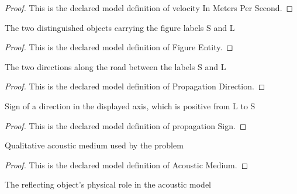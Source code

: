 \begin{proof}
  This is the declared model definition of velocity In Meters Per Second.
\end{proof}
\begin{definition}
  \label{def:physics:phyx-mini-0197:phyxminiproblems-problemphyxmini0197-figureentity}
  The two distinguished objects carrying the figure labels S and L
\end{definition}
\begin{proof}
  This is the declared model definition of Figure Entity.
\end{proof}
\begin{definition}
  \label{def:physics:phyx-mini-0197:phyxminiproblems-problemphyxmini0197-propagationdirection}
  The two directions along the road between the labels S and L
\end{definition}
\begin{proof}
  This is the declared model definition of Propagation Direction.
\end{proof}
\begin{definition}
  \label{def:physics:phyx-mini-0197:phyxminiproblems-problemphyxmini0197-propagationsign}
  Sign of a direction in the displayed axis, which is positive from L to S
\end{definition}
\begin{proof}
  This is the declared model definition of propagation Sign.
\end{proof}
\begin{definition}
  \label{def:physics:phyx-mini-0197:phyxminiproblems-problemphyxmini0197-acousticmedium}
  Qualitative acoustic medium used by the problem
\end{definition}
\begin{proof}
  This is the declared model definition of Acoustic Medium.
\end{proof}
\begin{definition}
  \label{def:physics:phyx-mini-0197:phyxminiproblems-problemphyxmini0197-reflectorkind}
  The reflecting object's physical role in the acoustic model
\end{definition}
